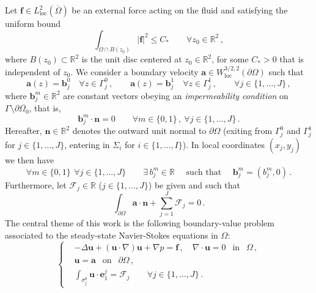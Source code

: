 \documentclass[11pt]{article}
\numberwithin{equation}{section}
\numberwithin{figure}{section}
\newcommand{\R}{\mathbb{R}}
\def\loc{{\mathrm{loc}}}
\def\R{{\mathbb R}}
\def\Fe{{\mathcal F}}
\def\fe{{\mathbf f}}
\def\n{{\mathbf n}}
\def\be{{\mathbf b}}
\def\ee{{\mathbf e}}
\def\ae{{\mathbf a}}
\def\fe{{\mathbf f}}
\begin{document}
Let $\fe\in L_\loc^{2}(\overline\Omega)$ be an external force acting on the fluid and satisfying the uniform bound
\begin{equation}  \label{uef}
	\int_{\Omega \cap B(z_0)}|\mathbf{f}|^2\le C_{*} \qquad \forall z_0\in\R^2\, ,
\end{equation}
where $B(z_0) \subset \mathbb{R}^2$ is the unit disc centered at $z_0\in\R^2$, for some $C_{*}>0$ that is independent of $z_{0}$.
We consider a boundary velocity $\ae\in W^{3/2,2}_\loc(\partial\Omega)$ such that
\begin{equation}  \label{bda}
\ae(z)=\be_j^0\quad\forall z\in\Gamma_j^0 \, , \qquad \ae(z)=\be_j^1\quad\forall z\in\Gamma_j^1\, ,\qquad \forall j \in \{1,\dots,J \} \, ,
\end{equation}
where $\be_{j}^m\in\R^2$ are constant vectors obeying an {\it impermeability condition} on $\Gamma \setminus \partial \overline{\Omega_0}$, that is,
\begin{equation}  \label{bda-1}
	\be_{j}^m\cdot\n=0 \qquad \forall m \in \{0,1 \} \, , \ \forall j \in \{1,\dots,J \} \, .
\end{equation}
Hereafter, $\n \in\R^2$ denotes the outward unit normal to $\partial\Omega$ (exiting from $\Gamma_j^0$ and $\Gamma_j^1$ for $j \in \{1,\dots,J \}$,
entering in $\Sigma_{i}$ for $i \in \{1,\dots,I \}$). In local coordinates $(x_j,y_j)$ we then have
\begin{equation} \label{slipbcori}
\forall m\in\{0,1\}\, \ \forall j\in\{1,\dots,J \}\qquad\exists\, b_j^m\in\mathbb{R}\quad\mbox{ such that }\quad\be_j^m = (b_j^m, 0)\, .
\end{equation}
Furthermore, let $\Fe_j\in\R$ ($j \in \{1,\dots,J \}$) be given and such that
\begin{equation} \label{ch5}
\int_{\partial\Omega} \ae\cdot\n+\sum\limits_{j=1}^J\Fe_j = 0 \, .
\end{equation}
The central theme of this work is the following boundary-value problem associated to the steady-state Navier-Stokes equations in $\Omega$:
\begin{equation}  \label{NSE}
	\left\{
	\begin{aligned}
		&- \Delta \mathbf{u} + (\mathbf{u} \cdot \nabla) \mathbf{u} + \nabla p = \mathbf{f} \, , \quad \nabla \cdot \mathbf{u} = 0 \ \ \mbox{ in } \ \ \Omega \, , \\[4pt]
		&\mathbf{u} = \ae \ \ \mbox{ on } \ \ \partial \Omega \, , \\[4pt]
		&  	\int_{\sigma_j^0} \mathbf{u} \cdot \ee_1^j = \Fe_j \qquad \forall j \in \{1,\dots,J \} \, .
	\end{aligned}
	\right.
\end{equation}
\end{document}
